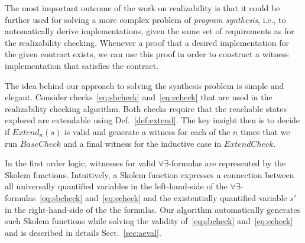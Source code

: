 The most important outcome of the work on realizability is that it 
 could be further used for solving a more complex problem of
\emph{program synthesis}, i.e., to automatically
derive implementations, given the same set of requirements as for the realizability checking.
Whenever a proof that a desired implementation for the given 
contract exists,  we can use this proof in order to construct a witness
implementation that satisfies the contract. 

The idea behind our approach to solving the synthesis problem is
simple and elegant. Consider checks~\eqref{eq:sbcheck} and~\eqref{eq:echeck} that
are used in the realizability checking algorithm. Both checks require
that the reachable states explored are extendable using
Def.~\ref{def:extend}.
The key insight then is to decide if $\mathit{Extend}_{n}(s)$ is valid and generate a witness 
for each of the $n$ times that we run $\mathit{BaseCheck}$ and a final witness 
for the inductive case in $\mathit{ExtendCheck}$.

In the first order logic, witnesses for valid $\forall\exists$-formulas are represented by the Skolem functions.
Intuitively, a Skolem function expresses a connection between all universally quantified variables in the left-hand-side of the $\forall\exists$-formulas~\eqref{eq:sbcheck} and~\eqref{eq:echeck} and the existentially quantified variable $s'$ in the right-hand-side of the the formulas.
Our algorithm automatically generates such Skolem functions
while solving the validity of~\eqref{eq:sbcheck} and~\eqref{eq:echeck} and is described in details Sect.~\ref{sec:aeval}.


